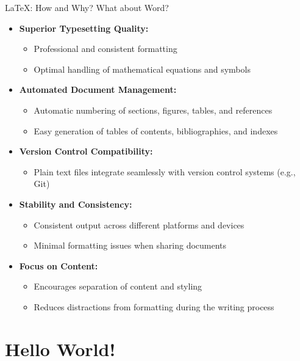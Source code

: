 \documentclass[aspectratio=169]{beamer}
\begin{document}
\begin{frame}{\LaTeX: How and Why? What about Word?}
    \begin{itemize}
        \item \textbf{Superior Typesetting Quality:}
            \begin{itemize}
                \item Professional and consistent formatting
                \item Optimal handling of mathematical equations and symbols
            \end{itemize}
        \item \textbf{Automated Document Management:}
            \begin{itemize}
                \item Automatic numbering of sections, figures, tables, and references
                \item Easy generation of tables of contents, bibliographies, and indexes
            \end{itemize}
        \item \textbf{Version Control Compatibility:}
            \begin{itemize}
                \item Plain text files integrate seamlessly with version control systems (e.g., Git)
            \end{itemize}
        \item \textbf{Stability and Consistency:}
            \begin{itemize}
                \item Consistent output across different platforms and devices
                \item Minimal formatting issues when sharing documents
            \end{itemize}
        \item \textbf{Focus on Content:}
            \begin{itemize}
                \item Encourages separation of content and styling
                \item Reduces distractions from formatting during the writing process
            \end{itemize}
    \end{itemize}
\end{frame}

\section{Hello World!}
\end{document}

